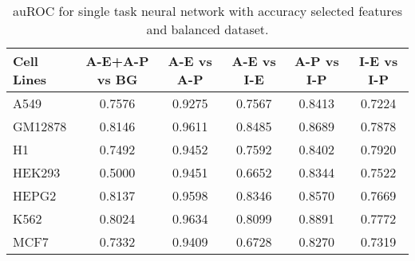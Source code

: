 \begin{table}[!htbp]
\centering
\caption{auROC for single task neural network with accuracy selected features and balanced dataset.}
\label{tab:balanced_old_auroc}
\begin{tabular}[t]{l*{5}{c}}
\toprule
Cell Lines & A-E+A-P vs BG & A-E vs A-P & A-E vs I-E & A-P vs I-P & I-E vs I-P \\
\midrule
A549  & 0.7576 & 0.9275 & 0.7567 & 0.8413 & 0.7224\\
GM12878  & 0.8146 & 0.9611 & 0.8485 & 0.8689 & 0.7878\\
H1  & 0.7492 & 0.9452 & 0.7592 & 0.8402 & 0.7920\\
HEK293  & 0.5000 & 0.9451 & 0.6652 & 0.8344 & 0.7522\\
HEPG2  & 0.8137 & 0.9598 & 0.8346 & 0.8570 & 0.7669\\
K562  & 0.8024 & 0.9634 & 0.8099 & 0.8891 & 0.7772\\
MCF7  & 0.7332 & 0.9409 & 0.6728 & 0.8270 & 0.7319\\
\bottomrule
\end{tabular}
\end{table}

